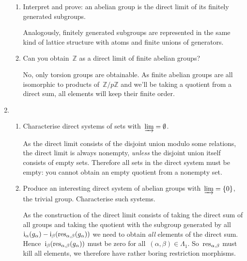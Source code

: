 \documentclass[a4paper,11pt,oneside,openany,article]{memoir}
\begin{document}
\begin{enumerate}
\begin{enumerate}
      \item Interpret and prove: an abelian group is the direct limit of its finitely generated subgroups.

        \begin{solution}
          Analogously, finitely generated subgroups are represented in the same kind of lattice structure with atoms and finite unions of generators. 
        \end{solution}

      \item Can you obtain~$\mathbb{Z}$ as a direct limit of finite abelian groups?

        \begin{solution}
          No, only torsion groups are obtainable. As finite abelian groups are all isomorphic to products of~$\mathbb{Z}/p\mathbb{Z}$ and we'll be taking a quotient from a direct sum, all elements will keep their finite order.
        \end{solution}
    \end{enumerate}

  \item
    \begin{enumerate}
      \item Characterise direct systems of sets with~$\varinjlim=\emptyset$.

        \begin{solution}
          As the direct limit consists of the disjoint union modulo some relations, the direct limit is always nonempty, \emph{unless} the disjoint union itself consists of empty sets. Therefore all sets in the direct system must be empty: you cannot obtain an empty quotient from a nonempty set.
        \end{solution}

      \item Produce an interesting direct system of abelian groups with~$\varinjlim=\left\{ 0 \right\}$, the trivial group. Characterise such systems.

        \begin{solution}
          As the construction of the direct limit consists of taking the direct sum of all groups and taking the quotient with the subgroup generated by all~$\mathrm{i}_\alpha(g_\alpha)-\mathrm{i}_\beta(\mathrm{res}_{\alpha,\beta}(g_\alpha))$ we need to obtain \emph{all} elements of the direct sum. Hence~$\mathrm{i}_\beta(\mathrm{res}_{\alpha,\beta}(g_\alpha))$ must be zero for all~$(\alpha,\beta)\in\Lambda_1$. So~$\mathrm{res}_{\alpha,\beta}$ must kill all elements, we therefore have rather boring restriction morphisms.
        \end{solution}
    \end{enumerate}


\end{enumerate}
\end{document}
